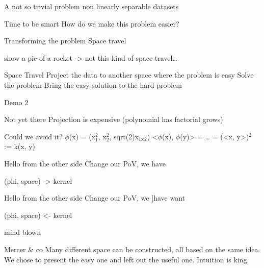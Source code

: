 \documentclass[bigger]{beamer}
\begin{document}
\begin{frame}[label=sec-1-11]{A not so trivial problem}
non linearly separable datasets
\end{frame}

\begin{frame}[label=sec-1-12]{Time to be smart}
How do we make this problem easier?
\end{frame}

\begin{frame}[label=sec-1-13]{Transforming the problem}
Space travel

show a pic of a rocket -> 
not this kind of space travel\ldots{}
\end{frame}

\begin{frame}[label=sec-1-14]{Space Travel}
Project the data to another space where the problem is easy
Solve the problem
Bring the easy solution to the hard problem
\end{frame}

\begin{frame}[label=sec-1-15]{Demo 2}
\end{frame}

\begin{frame}[label=sec-1-16]{Not yet there}
Projection is expensive
(polynomial has factorial grows)
\end{frame}

\begin{frame}[label=sec-1-17]{Could we avoid it?}
$\phi$(x) = (x$_{\text{1}}^{\text{2}}$, x$_{\text{2}}^{\text{2}}$, sqrt(2)x$_{\text{1x}}$$_{\text{2}}$)
<$\phi$(x), $\phi$(y)> = \ldots{} = (<x, y>)$^{\text{2}}$ := k(x, y)
\end{frame}

\begin{frame}[label=sec-1-18]{Hello from the other side}
Change our PoV, we have

(phi, space) -> kernel
\end{frame}

\begin{frame}[label=sec-1-19]{Hello from the other side}
Change our PoV, we \bar{have} want  

(phi, space) <- kernel

\alert{mind blown}
\end{frame}

\begin{frame}[label=sec-1-20]{Mercer \& co}
Many different space can be constructed, all based on the same idea.
We chose to present the easy one and left out the useful one. Intuition
is king.
\end{frame}
\end{document}
